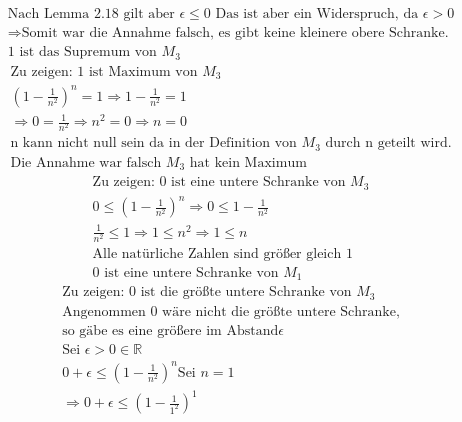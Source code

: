 \documentclass{article}
\begin{document}
\begin{enumerate}[label = (\alph*)]
\begin{gather*}
                    \text{Nach Lemma 2.18 gilt aber } \epsilon \leq 0 \text{ Das ist aber ein Widerspruch, da } \epsilon > 0 \\
                    \Rightarrow \text{Somit war die Annahme falsch, es gibt keine kleinere obere Schranke.} \\
                    \text{1 ist das Supremum von } M_3
                \end{gather*}
                \begin{gather*}
                    \text{Zu zeigen: 1 ist Maximum von } M_3 \\
                    {\left(1- \frac{1}{n^2}\right)}^n = 1 \Rightarrow 1- \frac{1}{n^2} = 1 \\
                    \Rightarrow 0 = \frac{1}{n^2} \Rightarrow n^2 = 0 \Rightarrow n=0 \\
                    \text{n kann nicht null sein da in der Definition von } M_3 \text{ durch n geteilt wird.} \\
                    \text{Die Annahme war falsch } M_3 \text{ hat kein Maximum}
                \end{gather*}
                \begin{gather*}
                    \text{Zu zeigen: 0 ist eine untere Schranke von } M_3 \\
                    0 \leq {\left(1- \frac{1}{n^2}\right)}^n \Rightarrow 0 \leq 1- \frac{1}{n^2} \\
                    \frac{1}{n^2} \leq 1 \Rightarrow 1 \leq n^2 \Rightarrow 1 \leq n \\
                    \text{Alle natürliche Zahlen sind größer gleich 1} \\
                    \text{0 ist eine untere Schranke von } M_1
                \end{gather*}
                \begin{gather*}
                    \text{Zu zeigen: 0 ist die größte untere Schranke von } M_3 \\
                    \text{Angenommen 0 wäre nicht die größte untere Schranke,} \\
                    \text{so gäbe es eine größere im Abstand} \epsilon \\
                    \text{Sei } \epsilon > 0 \in \mathbb{R} \\
                    0 + \epsilon \leq {\left(1- \frac{1}{n^2}\right)}^n
                    \text{Sei } n=1 \\
                    \Rightarrow 0 + \epsilon \leq {\left(1- \frac{1}{1^2}\right)}^1 \\

\end{gather*}
\end{enumerate}
\end{document}

